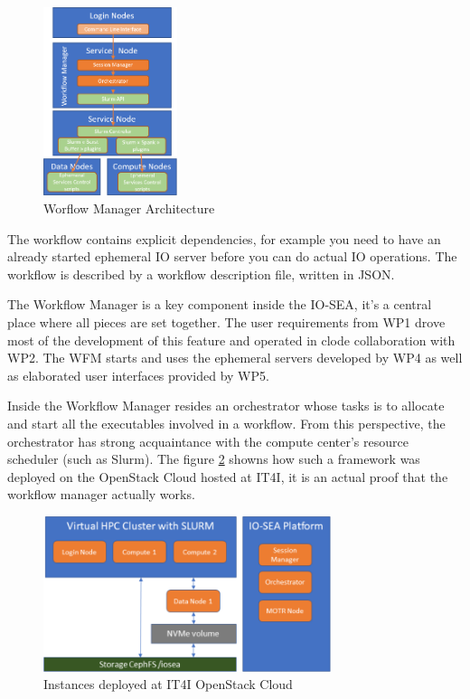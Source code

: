 \begin{figure}[H]
    \centering
    \includegraphics[width=0.35\textwidth]{FIGS/wfm.png}
    \caption[Worflow Manager Architecture]{ Worflow Manager Architecture}
    \label{fig:wfm}
\end{figure}

The workflow contains explicit dependencies, for example you need to have an
already started ephemeral IO server before you can do actual IO operations. The workflow is described by a 
workflow description file, written in JSON. 

The Workflow Manager is a key component inside the IO-SEA, it's a central place where all pieces are set
together. The user requirements from WP1 drove most of the development of this feature and operated in clode
collaboration with WP2. The WFM starts and uses the ephemeral servers developed by WP4 as well as elaborated
user interfaces provided by WP5. 

Inside the Workflow Manager resides an orchestrator whose tasks is to allocate and start all the executables
involved in a workflow. From this perspective, the orchestrator has strong acquaintance with the compute center's
resource scheduler (such as Slurm). The figure \ref{fig:it4i} showns how such a framework was deployed on the 
OpenStack Cloud hosted at IT4I, it is an actual proof that the workflow manager actually works. 

\begin{figure}[H]
    \centering
    \includegraphics[width=0.75\textwidth]{FIGS/it4i.png}
    \caption[Worflow Manager at IT4I]{Instances deployed at IT4I OpenStack Cloud}
    \label{fig:it4i}
\end{figure}

